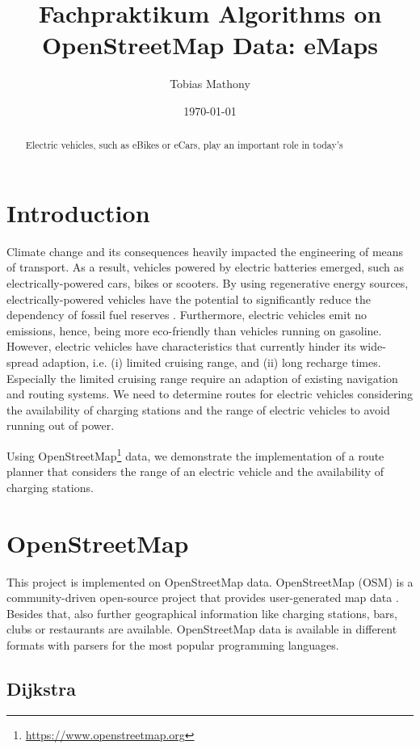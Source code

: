 \documentclass[a4paper]{article}
\author{Tobias Mathony}
\title{Fachpraktikum Algorithms on OpenStreetMap Data: eMaps}
\date{\today}
\begin{document}
\maketitle
\begin{abstract}
Electric vehicles, such as eBikes or eCars, play an important role in today's
\end{abstract}
\section{Introduction}
Climate change and its consequences heavily impacted the engineering of means of transport.
As a result, vehicles powered by electric batteries emerged, such as electrically-powered cars, bikes or scooters.
By using regenerative energy sources, electrically-powered vehicles have the potential to significantly reduce the dependency of fossil fuel reserves \cite{Artmeier2010_Optimal}.
Furthermore, electric vehicles emit no emissions, hence, being more eco-friendly than vehicles running on gasoline.
However, electric vehicles have characteristics that currently hinder its wide-spread adaption, i.e. (i) limited cruising range, and (ii) long recharge times\cite{Artmeier2010_Optimal}.
Especially the limited cruising range require an adaption of existing navigation and routing systems.
We need to determine routes for electric vehicles considering the availability of charging stations and the range of electric vehicles to avoid running out of power.\par\medskip
Using OpenStreetMap\footnote{\url{https://www.openstreetmap.org}} data, we demonstrate the implementation of a route planner that considers the range of an electric vehicle and the availability of charging stations. 
\section{OpenStreetMap}
This project is implemented on OpenStreetMap data.
OpenStreetMap (OSM) is a community-driven open-source project that provides user-generated map data \cite{Haklay2008}.
Besides that, also further geographical information like charging stations, bars, clubs or restaurants are available.
OpenStreetMap data is available in different formats with parsers for the most popular programming languages.\par\medskip
\subsection{Dijkstra}
\end{document}
